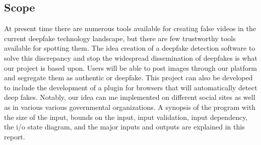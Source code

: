 \subsection{Scope}
At present time there are numerous tools available for creating false videos in the current deepfake technology landscape, but there are few trustworthy tools available for spotting them. The idea creation of a deepfake detection software to solve this discrepancy and stop the widespread dissemination of deepfakes is what our project is based upon. Users will be able to post images through our platform and segregate them as authentic or deepfake. This project can also be developed to include the development of a plugin for browsers that will automatically detect deep fakes. Notably, our idea can me implemented on different social sites as well as in various various governmental organizations. A synopsis of the program with the size of the input, bounds on the input, input validation, input dependency, the i/o state diagram, and the major inputs and outputs are explained in this report.